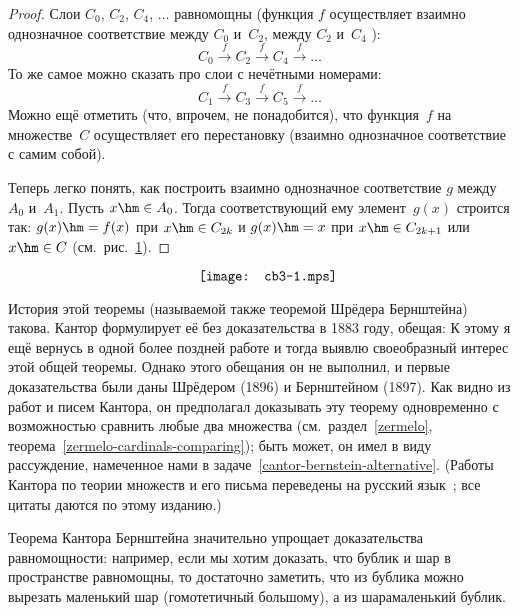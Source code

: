 \begin{proof}
Слои $C_0$, $C_2$, $C_4$, $\dots$ равномощны (функция $f$ осуществляет
взаимно однозначное соответствие между $C_0$ и~$C_2$, между
$C_2$ и~$C_4$ ):
        $$
  C_0 \stackrel{f}\longrightarrow C_2 \stackrel{f}\longrightarrow
  C_4 \stackrel{f}\longrightarrow \ldots
        $$
То же самое можно сказать про слои с нечётными номерами:
        $$
  C_1 \stackrel{f}\longrightarrow C_3 \stackrel{f}\longrightarrow
  C_5 \stackrel{f}\longrightarrow \ldots
        $$
Можно ещё отметить (что, впрочем, не понадобится), что функция~$f$
на множестве~$C$ осуществляет его перестановку (взаимно однозначное
соответствие с самим собой\-).

Теперь легко понять, как построить взаимно однозначное
соответствие $g$ между $A_0$ и~$A_1$. Пусть $x\hm\in A_0$. Тогда
соответствующий ему элемент~$g(x)$ строится так: $g(x)\hm=f(x)$
при $x\hm\in C_{2k}$ и $g(x)\hm=x$ при $x\hm\in C_{2k+1}$ или
$x\hm\in C$ (см.~рис.~\ref{cb-3}).
\end{proof}
\begin{figure}[ht]
        $$
\hspace*{4mm}\texttt{[image: cb3-1.mps]}
        $$
\vspace*{-5mm}
\caption{}
\label{cb-3}
\end{figure}

\begin{historyremark}
История этой теоремы (называемой также теоремой Шрё\-де\-ра\ч
Бернштейна) такова.
Кантор формулирует её без доказательства в
1883 году, обещая:  К этому я ещё вернусь в одной более
поздней работе и тогда выявлю своеобразный интерес этой общей
теоремы. Однако этого обещания он не выполнил, и первые
доказательства были даны Шрёдером (1896) и
Бернштейном (1897).
Как видно из работ и писем Кантора, он предполагал доказывать
эту теорему одновременно с возможностью сравнить любые два
множества (см.~раздел~\ref{zermelo},
теорема~\ref{zermelo-cardinals-comparing}); быть может, он имел в виду рассуждение, намеченное нами в задаче~\ref{cantor-bernstein-alternative}. (Работы Кантора по теории множеств и его
письма переведены на русский язык~\cite{cantor}; все цитаты
даются по этому изданию.)
\end{historyremark}

Теорема Кантора\ч
Бернштейна значительно упрощает доказательства равномощности:
например, если мы хотим доказать, что бублик и шар в
пространстве равномощны, то достаточно заметить, что из бублика
можно вырезать маленький шар (гомотетичный большому), а из
шара\т маленький бублик.


